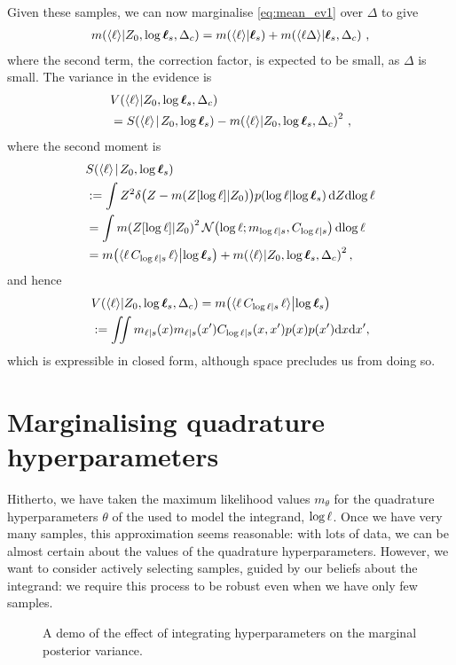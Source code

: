 \documentclass{article}
\begin{document}
Given these samples, we can now marginalise \eqref{eq:mean_ev1} over $\Delta$ to give
\begin{align*}
 \mean{\inty{\lfn}}{Z_0,\tvr_s,\Delta_c} =
\mean{\inty{\lfn}}{\vr_s} + \mean{\inty{\lfn \Delta}}{\vr_s, \Delta_c}\,,
\end{align*}
where the second term, the correction factor, is expected to be small, as $\Delta$ is small. The variance in the evidence is
\begin{align*}
& \cov{\inty{\lfn}}{Z_0,\tvr_s,\Delta_c}\\ 
& = \secm{\inty{\lfn}}{Z_0,\tvr_s} - \mean{\inty{\lfn}}{Z_0,\tvr_s,\Delta_c}^2\,,
\end{align*}
where the second moment is 
\begin{align*}
& \secm{\inty{\lfn}}{Z_0,\tvr_s}  \\
& \deq \int Z^2 
\delta\bigl(Z - \mean{Z[\tr]}{Z_0}\bigr)
\p{\tr}{\tvr_s}
\ud Z \ud\tr\\
& = \int \mean{Z[\tr]}{Z_0}^2
\N{\tr}{\meancondfn{\tr}{s}}{C_{\tr|s}}
 \ud\tr\\
& = \mean{\inty{\lfn\,C_{\tr|s}\,\lfn}}{\tvr_s}+
\mean{\inty{\lfn}}{Z_0,\tvr_s,\Delta_c}^2,
\end{align*}
and hence 
\begin{align*}
  &\cov{\inty{\lfn}}{Z_0,\tvr_s,\Delta_c} = \mean{\inty{\lfn\,C_{\tr|s}\,\lfn}}{\tvr_s} \\ 
& \deq
 \iint m_{\lfn|s}(\lfv) m_{\lfn|s}(\lfv') C_{\tr|s}(\lfv,\lfv')  p(x) p(x') \ud \lfv \ud\lfv',
\end{align*}
which is expressible in closed form, although space precludes us from doing so.




\section{Marginalising quadrature hyperparameters}
\label{sec:marginalization}
Hitherto, we have taken the maximum likelihood values $m_\theta$ for the quadrature hyperparameters $\theta$ of the \gpb used to model the integrand, $\tr$. Once we have very many samples, this approximation seems reasonable: with lots of data, we can be almost certain about the values of the quadrature hyperparameters. However, we want to consider actively selecting samples, guided by our beliefs about the integrand: we require this process to be robust even when we have only few samples. 


\begin{figure}
\centering
{}
\caption{A demo of the effect of integrating hyperparameters on the marginal posterior variance.}
\label{fig:integrate_hypers}
\end{figure}
\end{document}
